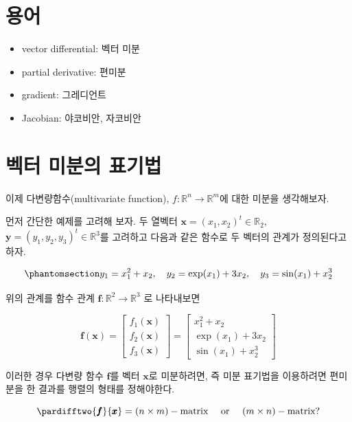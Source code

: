 \documentclass[
  11pt,
  a4paper,
  oneside]{scrbook}
\providecommand{\tightlist}{%
  \setlength{\itemsep}{0pt}\setlength{\parskip}{0pt}}\usepackage{longtable,booktabs,array}
\newcommand{\RR}{\mathbb{R}}
\theoremstyle{definition}
\theoremstyle{definition}
\theoremstyle{plain}
\theoremstyle{remark}
\begin{document}
\section{용어}\label{uxc6a9uxc5b4-2}

\begin{itemize}
\tightlist
\item
  vector differential: 벡터 미분
\item
  partial derivative: 편미분
\item
  gradient: 그레디언트
\item
  Jacobian: 야코비안, 자코비안
\end{itemize}

\section{벡터 미분의
표기법}\label{uxbca1uxd130-uxbbf8uxbd84uxc758-uxd45cuxae30uxbc95}

이제 다변량함수(multivariate function), \(f: \RR^n \rightarrow \RR^m\)에
대한 미분을 생각해보자.

먼저 간단한 예제를 고려해 보자. 두 열벡터
\(\pmb x=(x_1,x_2)^t \in \RR_2\), \(\pmb y=(y_1,y_2,y_3)^t \in \RR^3\)를
고려하고 다음과 같은 함수로 두 벡터의 관계가 정의된다고 하자.

\begin{equation}\phantomsection\label{eq-vec-cal-xy}{ 
y_1 = x_1^2 + x_2, \quad y_2= \exp (x_1) + 3 x_2, \quad y_3 = \sin(x_1) + x_2^3 
}\end{equation}

위의 관계를 함수 관계 \(\pmb f: \RR^2 \rightarrow \RR^3\) 로 나타내보면

\[ 
 \pmb f(\pmb x) = 
\begin{bmatrix} f_1(\pmb x) \\ f_2 (\pmb x) \\ f_3(\pmb x) \end{bmatrix} = 
\begin{bmatrix} x_1^2 + x_2 \\ \exp (x_1) + 3 x_2 \\ \sin(x_1) + x_2^3 \end{bmatrix} 
\]

이러한 경우 다변량 함수 \(\pmb f\)를 벡터 \(\pmb x\)로 미분하려면, 즉
미분 표기법을 이용하려면 편미분을 한 결과를 행렬의 형태를 정해야한다.

\[  \pardifftwo{ \pmb f}{\pmb x} = (n \times m)-\text{matrix} \quad \text{ or }  \quad (m \times n)-\text{matrix}? \]
\end{document}
